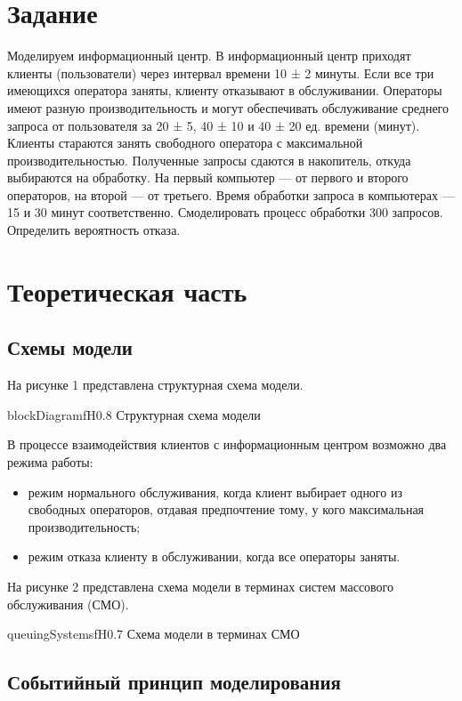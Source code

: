 \section{Задание}

Моделируем информационный центр. В информационный центр приходят клиенты (пользователи) через интервал времени 10 ± 2 минуты. Если все три имеющихся оператора заняты, клиенту отказывают в обслуживании. Операторы имеют разную производительность и могут обеспечивать обслуживание среднего запроса от пользователя за 20 ± 5, 40 ± 10 и 40 ± 20 ед. времени (минут). Клиенты стараются занять свободного оператора с максимальной производительностью. Полученные запросы сдаются в накопитель, откуда выбираются на обработку. На первый компьютер — от первого и второго операторов, на второй — от третьего. Время обработки запроса в компьютерах — 15 и 30 минут соответственно. Смоделировать процесс обработки 300 запросов. Определить вероятность отказа.

\section{Теоретическая часть}

\subsection{Схемы модели}

На рисунке 1 представлена структурная схема модели.

	{blockDiagram}{f}{H}{0.8\textwidth}
	{Структурная схема модели}

В процессе взаимодействия клиентов с информационным центром возможно два режима работы:

\begin{itemize}
    \item режим нормального обслуживания, когда клиент выбирает одного из свободных операторов, отдавая предпочтение тому, у кого максимальная производительность;
    \item режим отказа клиенту в обслуживании, когда все операторы заняты.
\end{itemize}

На рисунке 2 представлена схема модели в терминах систем массового обслуживания (СМО).

	{queuingSystems}{f}{H}{0.7\textwidth}
	{Схема модели в терминах СМО}

\subsection{Событийный принцип моделирования}

